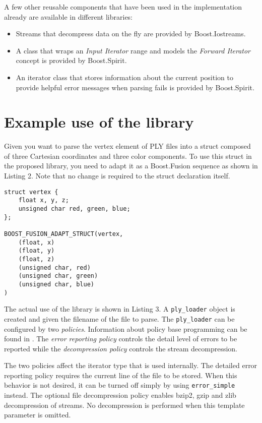 \documentclass[a4paper,parskip=half,twocolumn]{scrartcl}
\begin{document}
A few other reusable components that have been used in the implementation
already are available in different libraries:

\begin{itemize}
  \item Streams that decompress data on the fly are provided by Boost.Iostreams.
  \item A class that wraps an \emph{Input Iterator} range and models the
  \emph{Forward Iterator} concept is provided by Boost.Spirit.
  \item An iterator class that stores information about the current position to
  provide helpful error messages when parsing fails is provided by Boost.Spirit.
\end{itemize}

\section{Example use of the library}

Given you want to parse the vertex element of PLY files into a struct composed
of three Cartesian coordinates and three color components. To use this struct in
the proposed library, you need to adapt it as a Boost.Fusion sequence as shown
in Listing 2. Note that no change is required to the struct declaration itself.

\begin{lstlisting}[frame=tb,caption=Adapting a vertex struct]
struct vertex {
	float x, y, z;
	unsigned char red, green, blue;
};

BOOST_FUSION_ADAPT_STRUCT(vertex,
	(float, x)
	(float, y)
	(float, z)
	(unsigned char, red)
	(unsigned char, green)
	(unsigned char, blue)
)
\end{lstlisting}

The actual use of the library is shown in Listing 3. A \texttt{ply\_loader}
object is created and given the filename of the file to parse. The
\texttt{ply\_loader} can be configured by two \emph{policies}. Information about
policy base programming can be found in \cite{Alexandrescu:2001:MCD:377789}. The
\emph{error reporting policy} controls the detail level of errors to be reported
while the \emph{decompression policy} controls the stream decompression.

The two policies affect the iterator type that is used internally. The detailed
error reporting policy requires the current line of the file to be stored. When
this behavior is not desired, it can be turned off simply by using
\texttt{error\_simple} instead. The optional file decompression policy enables
bzip2, gzip and zlib decompression of streams. No decompression is performed
when this template parameter is omitted.
\end{document}
